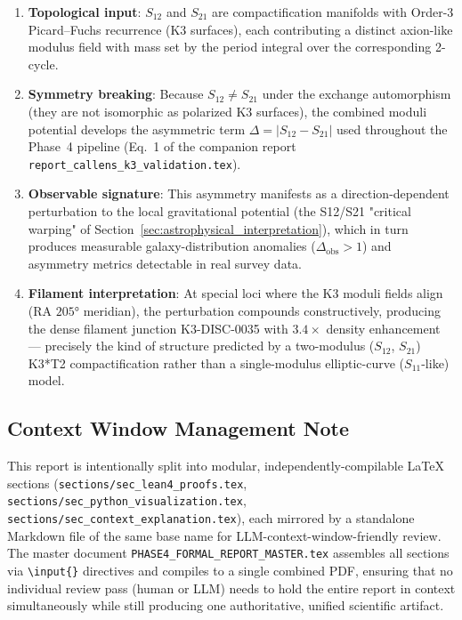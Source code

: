 \begin{enumerate}
    \item \textbf{Topological input}: $S_{12}$ and $S_{21}$ are compactification
    manifolds with Order-3 Picard--Fuchs recurrence (K3 surfaces), each
    contributing a distinct axion-like modulus field with mass set by the
    period integral over the corresponding 2-cycle.
    \item \textbf{Symmetry breaking}: Because $S_{12} \neq S_{21}$ under the
    exchange automorphism (they are not isomorphic as polarized K3 surfaces),
    the combined moduli potential develops the asymmetric term
    $\Delta = |S_{12} - S_{21}|$ used throughout the Phase~4 pipeline
    (Eq.~1 of the companion report \texttt{report\_callens\_k3\_validation.tex}).
    \item \textbf{Observable signature}: This asymmetry manifests as a
    direction-dependent perturbation to the local gravitational potential
    (the S12/S21 "critical warping" of Section~\ref{sec:astrophysical_interpretation}),
    which in turn produces measurable galaxy-distribution anomalies
    ($\Delta_{\text{obs}} > 1$) and asymmetry metrics detectable in real
    survey data.
    \item \textbf{Filament interpretation}: At special loci where the K3
    moduli fields align (RA $205°$ meridian), the perturbation compounds
    constructively, producing the dense filament junction K3-DISC-0035 with
    $3.4\times$ density enhancement — precisely the kind of structure
    predicted by a two-modulus ($S_{12}$, $S_{21}$) K3*T2 compactification
    rather than a single-modulus elliptic-curve ($S_{11}$-like) model.
\end{enumerate}

\subsection{Context Window Management Note}

This report is intentionally split into modular, independently-compilable
\LaTeX{} sections (\texttt{sections/sec\_lean4\_proofs.tex},
\texttt{sections/sec\_python\_visualization.tex},
\texttt{sections/sec\_context\_explanation.tex}), each mirrored by a
standalone Markdown file of the same base name for LLM-context-window-friendly
review. The master document \texttt{PHASE4\_FORMAL\_REPORT\_MASTER.tex}
assembles all sections via \texttt{\textbackslash input\{\}} directives and
compiles to a single combined PDF, ensuring that no individual review pass
(human or LLM) needs to hold the entire report in context simultaneously while
still producing one authoritative, unified scientific artifact.
